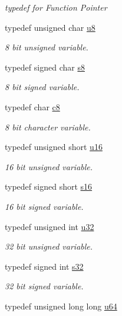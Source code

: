 \begin{DoxyCompactItemize}
\begin{DoxyCompactList}\small\item\em typedef for Function Pointer \end{DoxyCompactList}\item 
typedef unsigned char \hyperlink{namespaceirr_a646874f69af8ff87fc10201b0254a761}{u8}
\begin{DoxyCompactList}\small\item\em 8 bit unsigned variable. \end{DoxyCompactList}\item 
typedef signed char \hyperlink{namespaceirr_adc3ec66d7537550be0fea1c9eeadd63d}{s8}
\begin{DoxyCompactList}\small\item\em 8 bit signed variable. \end{DoxyCompactList}\item 
typedef char \hyperlink{namespaceirr_a9395eaea339bcb546b319e9c96bf7410}{c8}
\begin{DoxyCompactList}\small\item\em 8 bit character variable. \end{DoxyCompactList}\item 
typedef unsigned short \hyperlink{namespaceirr_ae9f8ec82692ad3b83c21f555bfa70bcc}{u16}
\begin{DoxyCompactList}\small\item\em 16 bit unsigned variable. \end{DoxyCompactList}\item 
typedef signed short \hyperlink{namespaceirr_a43ace0af066371ac0862bac3f7314220}{s16}
\begin{DoxyCompactList}\small\item\em 16 bit signed variable. \end{DoxyCompactList}\item 
typedef unsigned int \hyperlink{namespaceirr_a0416a53257075833e7002efd0a18e804}{u32}
\begin{DoxyCompactList}\small\item\em 32 bit unsigned variable. \end{DoxyCompactList}\item 
typedef signed int \hyperlink{namespaceirr_ac66849b7a6ed16e30ebede579f9b47c6}{s32}
\begin{DoxyCompactList}\small\item\em 32 bit signed variable. \end{DoxyCompactList}\item 
typedef unsigned long long \hyperlink{namespaceirr_a9701cac11d289143453e212684075af7}{u64}

\end{DoxyCompactItemize}

